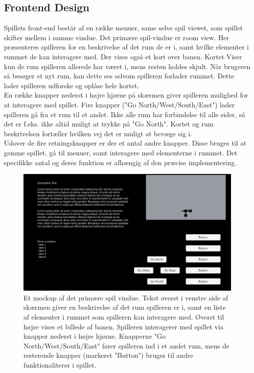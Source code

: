 \subsection{Frontend Design}
\label{ssec:FE Design}

Spillets front-end består af en række menuer, same selve spil viewet, som spillet skifter mellem i samme vindue.
Det primære spil-vindue er room view. Her præsenteres spilleren for en beskrivelse af det rum de er i, samt hvilke elementer i rummet de kan interagere med. Der vises også et kort over banen. Kortet Viser kun de rum spilleren allerede har været i, mens resten holdes skjult. Når brugeren så besøger et nyt rum, kan dette ses selvom spilleren forlader rummet. Dette lader spilleren udforske og oplåse hele kortet.\\
En række knapper nederst i højre hjørne på skærmen giver spilleren mulighed for at interagere med spillet. Fire knapper ("Go {North/West/South/East}") lader spilleren gå fra et rum til et andet. Ikke alle rum har forbindelse til alle sider, så det er f.eks. ikke altid muligt at trykke på "Go North". Kortet og rum beskrivelsen fortæller hvilken vej det er muligt at bevæge sig i.\\
Udover de fire retningsknapper er der et antal andre knapper. Disse bruges til at gemme spillet, gå til menuer, samt interagere med elementerne i rummet. Det specifikke antal og deres funktion er afhængig af den præcise implementering.

\begin{figure}[H]
\centering
\includegraphics[width = \textwidth]{02-Body/Images/RoomMockup.PNG}
\caption{Et mockup af det primære spil vindue. Tekst øverst i venstre side af skærmen giver en beskrivelse af det rum spilleren er i, samt en liste af elementer i rummet som spilleren kan interagere med. Øverst til højre vises et billede af banen. Spilleren interagerer med spillet via knapper nederst i højre hjørne. Knapperne "Go {North/West/South/East}" fører spilleren ind i et andet rum, mens de resterende knapper (markeret "Button") bruges til andre funktionaliterer i spillet.}
\label{fig:Design-FE-mockup-room}
\end{figure}